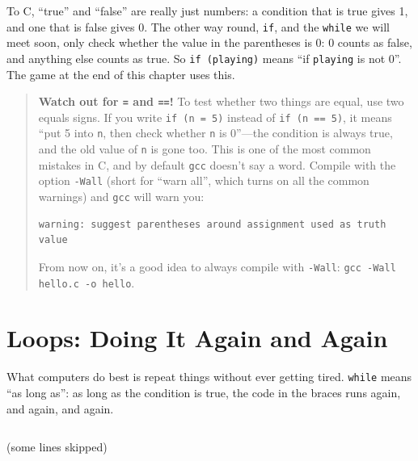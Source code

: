 
\inputminted[linenos=false]{text}{code/en/ch02/out/leap.txt}

To C, ``true'' and ``false'' are really just numbers: a condition that is true gives 1, and one that is false gives 0. The other way round, \texttt{if}, and the \texttt{while} we will meet soon, only check whether the value in the parentheses is 0: 0 counts as false, and anything else counts as true. So \texttt{if (playing)} means ``if \texttt{playing} is not 0''. The game at the end of this chapter uses this.

\begin{quote}
  \textbf{Watch out for \texttt{=} and \texttt{==}!} To test whether two things are equal, use two equals signs. If you write \texttt{if (n = 5)} instead of \texttt{if (n == 5)}, it means ``put 5 into \texttt{n}, then check whether \texttt{n} is 0''---the condition is always true, and the old value of \texttt{n} is gone too. This is one of the most common mistakes in C, and by default \texttt{gcc} doesn't say a word. Compile with the option \texttt{-Wall} (short for ``warn all'', which turns on all the common warnings) and \texttt{gcc} will warn you:
\begin{verbatim}
warning: suggest parentheses around assignment used as truth value
\end{verbatim}
  From now on, it's a good idea to always compile with \texttt{-Wall}: \texttt{gcc -Wall hello.c -o hello}.
\end{quote}

\section{\texorpdfstring{}{while} Loops: Doing It Again and Again}
\label{sec:while}

What computers do best is repeat things without ever getting tired. \texttt{while} means ``as long as'': as long as the condition is true, the code in the braces runs again, and again, and again.


\inputminted[linenos=false, lastline=3]{text}{code/en/ch02/out/countdown.txt}
\vspace{-0.5\baselineskip}
\begin{center}(some lines skipped)\end{center}
\vspace{-0.5\baselineskip}
\inputminted[linenos=false, firstline=10]{text}{code/en/ch02/out/countdown.txt}

